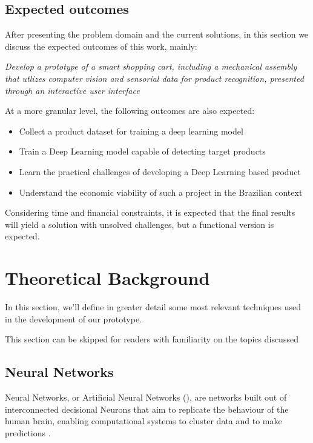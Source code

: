 \documentclass[openright]{normas-utf-tex} %
\begin{document}
\section{Expected outcomes}

After presenting the problem domain and the current solutions, in this section we discuss the expected
outcomes of this work, mainly:

\textit{Develop a prototype of a smart shopping cart, including a mechanical
assembly that utlizes computer vision and sensorial data for product recognition, presented through an interactive user
interface}

At a more granular level, the following outcomes are also expected:

\begin{itemize}
    \item Collect a product dataset for training a deep learning model
    \item Train a Deep Learning model capable of detecting target products
	\item Learn the practical challenges of developing a Deep Learning based product
    \item Understand the economic viability of such a project in the Brazilian context
\end{itemize}

Considering time and financial constraints, it is expected that the final results will yield
a solution with unsolved challenges, but a functional version is expected.

\chapter{Theoretical Background}

In this section, we'll define in greater detail some most relevant techniques
used in the development of our prototype.

This section can be skipped for readers with familiarity on the topics discussed

\section{Neural Networks}

Neural Networks, or Artificial Neural Networks (),
are networks built out of interconnected decisional Neurons that aim to replicate 
the behaviour of the human brain, enabling computational systems to cluster data
and to make predictions \cite{IBMNeuralNetworks}. 
\end{document}
